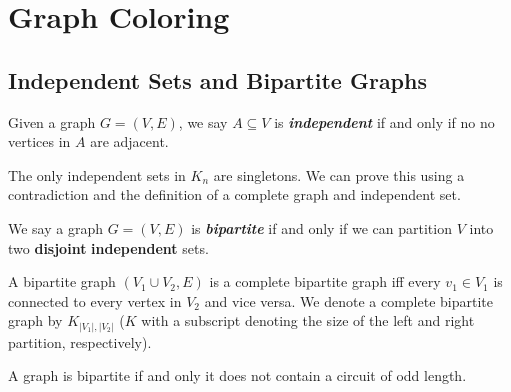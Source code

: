 \section{Graph Coloring}

\subsection{Independent Sets and Bipartite Graphs}

\begin{definition}
    Given a graph $G = (V,E)$, we say $A \subseteq V$ is \textit{\textbf{independent}} if and only if no no vertices in $A$ are adjacent.
\end{definition}

The only independent sets in $K_n$ are singletons. We can prove this using a contradiction and the definition of a complete graph and independent set.

\begin{definition}
    We say a graph $G = (V,E)$ is \textit{\textbf{bipartite}} if and only if we can partition $V$ into two \textbf{disjoint} \textbf{independent} sets.
\end{definition}

A bipartite graph $(V_1 \cup V_2, E)$ is a complete bipartite graph iff every $v_1 \in V_1$ is connected to every vertex in $V_2$ and vice versa. We denote a complete bipartite graph by $K_{|V_1|,|V_2|}$ ($K$ with a subscript denoting the size of the left and right partition, respectively).

\begin{theorem} \label{thm:odd-length-cycle-bipartite}
    A graph is bipartite if and only it does not contain a circuit of odd length.
\end{theorem}

